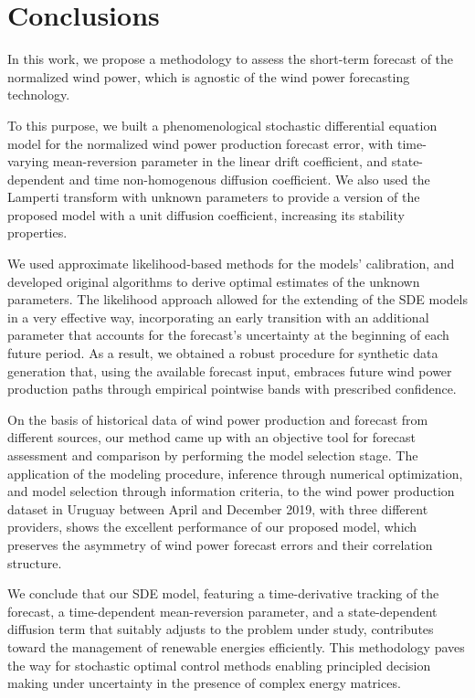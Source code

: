 \documentclass[11pt]{article}
\theoremstyle{definition}
\begin{document}

\section{Conclusions} \label{Section_7}

In this work, we propose a methodology to assess the short-term forecast of the normalized wind power, which is agnostic of the wind power forecasting technology. 

To this purpose, we built a phenomenological stochastic differential equation model for the normalized wind power production forecast error, with time-varying mean-reversion parameter in the linear drift coefficient, and state-dependent and time non-homogenous diffusion coefficient. We also used the Lamperti transform with unknown parameters to provide a version of the proposed model with a unit diffusion coefficient, increasing its stability properties.

We used approximate likelihood-based methods for the models' calibration, and developed original algorithms to derive optimal estimates of the unknown parameters.
The likelihood approach allowed for the extending of the SDE models in a very effective way, incorporating an early transition with an additional parameter that accounts for the forecast's uncertainty at the beginning of each future period. As a result, we obtained a robust procedure for synthetic data generation that, using the available forecast input, embraces future wind power production paths through empirical pointwise bands with prescribed confidence. 

On the basis of historical data of wind power production and forecast from different sources, our method came up with an objective tool for forecast assessment and comparison by performing the model selection stage.
The application of the modeling procedure, inference through numerical optimization, and model selection through information criteria, to the wind power production dataset in Uruguay between April and December 2019, with three different providers, shows the excellent performance of our proposed model, which preserves the asymmetry of wind power forecast errors and their correlation structure.
 
We conclude that our SDE model, featuring a time-derivative tracking of the forecast, a time-dependent mean-reversion parameter, and a state-dependent diffusion term that suitably adjusts to the problem under study, contributes toward the management of renewable energies efficiently. This methodology paves the way for stochastic optimal control methods enabling principled decision making under uncertainty in the presence of complex energy matrices.
 
\end{document}
